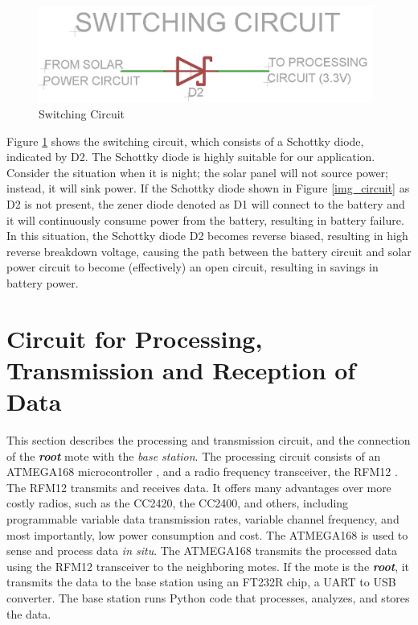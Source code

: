 \begin{figure}[htbp]
\centering
\includegraphics[width=110mm]{switchin_ckt.PNG}
\caption{Switching Circuit}
\label{img_switchingCircuit}
\end{figure}

Figure \ref{img_switchingCircuit} shows the switching circuit, which consists of a Schottky diode, indicated by D2. The Schottky diode is highly suitable for our application. Consider the situation when it is night; the solar panel will not source power; instead, it will sink power. If the Schottky diode shown in Figure \ref{img_circuit} as D2 is not present, the zener diode denoted as D1 will connect to the battery and it will continuously consume power from the battery, resulting in battery failure. In this situation, the Schottky diode D2 becomes reverse biased, resulting in high reverse breakdown voltage, causing the path between the battery circuit and solar power circuit to become (effectively) an open circuit, resulting in savings in battery power.


\section{Circuit for Processing, Transmission and Reception of Data}
This section describes the processing and transmission circuit, and the connection of the \textit{\textbf{root}} mote with the \textit{base station}. The processing circuit consists of an ATMEGA168 microcontroller \cite{bib_atmega}, and a radio frequency transceiver, the RFM12 \cite{bib_rfm12}. The RFM12 transmits and receives data. It offers many advantages over more costly radios, such as the CC2420, the CC2400, and others, including programmable variable data transmission rates, variable channel frequency, and most importantly, low power consumption and cost. The ATMEGA168 is used to sense and process data \textit{in situ}. The ATMEGA168 transmits the processed data using the RFM12 transceiver to the neighboring motes. If the mote is the  \textit{\textbf{root}}, it transmits the data to the base station using an FT232R \cite{bib_ftdi} chip, a UART to USB converter. The base station runs Python code that processes, analyzes, and stores the data.

